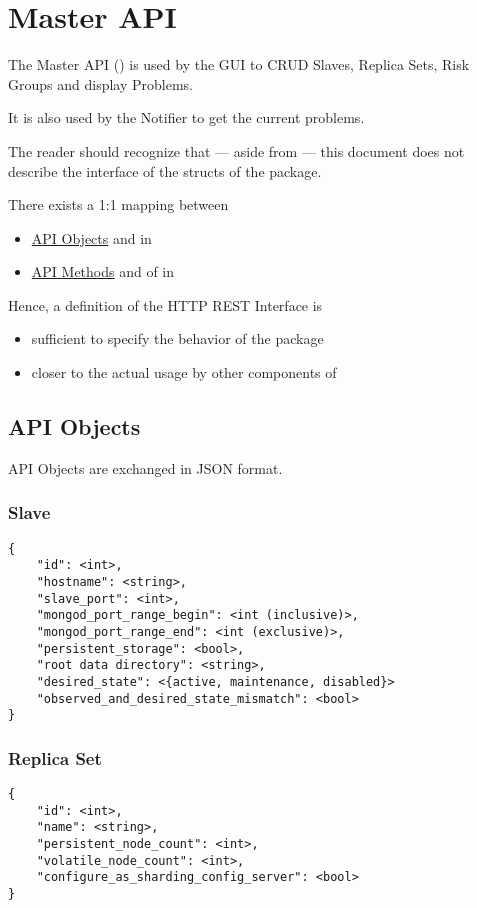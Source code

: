 \section{Master API}
\renewcommand{\gocurpackage}{masterapi}
The Master API () is used by the GUI to CRUD Slaves, Replica Sets, Risk Groups and display Problems.

It is also used by the Notifier to get the current problems.

The reader should recognize that --- aside from  --- this document does not describe the interface
of the structs of the package.

There exists a 1:1 mapping between
\begin{itemize}
  \item \hyperref[masterapi:apiobjects]{API Objects} and  in 
  \item \hyperref[masterapi:apimethods]{API Methods} and  of  in 
\end{itemize}

Hence, a definition of the HTTP REST Interface is
\begin{itemize}
  \item sufficient to specify the behavior of the  package
  \item closer to the actual usage by other components of \mamid
\end{itemize}

\subsection{API Objects} \label{masterapi:apiobjects}
API Objects are exchanged in JSON format.
\subsubsection{Slave}
\begin{lstlisting}
{
	"id": <int>,
	"hostname": <string>,
	"slave_port": <int>,
	"mongod_port_range_begin": <int (inclusive)>,
	"mongod_port_range_end": <int (exclusive)>,
	"persistent_storage": <bool>,
	"root data directory": <string>,
	"desired_state": <{active, maintenance, disabled}>
	"observed_and_desired_state_mismatch": <bool>
}
\end{lstlisting}
\subsubsection{Replica Set}
\begin{lstlisting}
{
	"id": <int>,
	"name": <string>,
	"persistent_node_count": <int>,
	"volatile_node_count": <int>,
	"configure_as_sharding_config_server": <bool>
}
\end{lstlisting}
